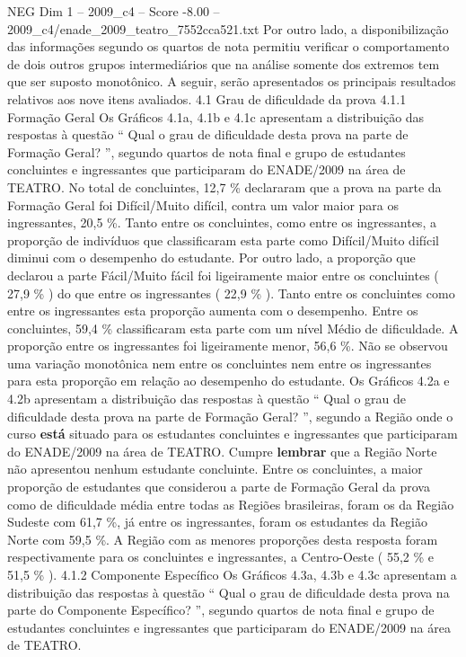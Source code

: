 \begin{textsample}{NEG Dim 1 – 2009\_c4 – Score -8.00 – 2009\_c4/enade\_2009\_teatro\_7552cca521.txt}
Por outro lado, a disponibilização das informações segundo os quartos de nota permitiu verificar o comportamento de dois outros grupos intermediários que na análise somente dos extremos tem que ser suposto monotônico.
A seguir, serão apresentados os principais resultados relativos aos nove itens avaliados. 4.1 Grau de dificuldade da prova 4.1.1 Formação Geral Os Gráficos 4.1a, 4.1b e 4.1c apresentam a distribuição das respostas à questão “ Qual o grau de dificuldade desta prova na parte de Formação Geral? ”, segundo quartos de nota final e grupo de estudantes concluintes e ingressantes que participaram do ENADE/2009 na área de TEATRO.
No total de concluintes, 12,7 \% declararam que a prova na parte da Formação Geral foi Difícil/Muito difícil, contra um valor maior para os ingressantes, 20,5 \%.
Tanto entre os concluintes, como entre os ingressantes, a proporção de indivíduos que classificaram esta parte como Difícil/Muito difícil diminui com o desempenho do estudante.
Por outro lado, a proporção que declarou a parte Fácil/Muito fácil foi ligeiramente maior entre os concluintes ( 27,9 \% ) do que entre os ingressantes ( 22,9 \% ).
Tanto entre os concluintes como entre os ingressantes esta proporção aumenta com o desempenho.
Entre os concluintes, 59,4 \% classificaram esta parte com um nível Médio de dificuldade.
A proporção entre os ingressantes foi ligeiramente menor, 56,6 \%.
Não se observou uma variação monotônica nem entre os concluintes nem entre os ingressantes para esta proporção em relação ao desempenho do estudante.
Os Gráficos 4.2a e 4.2b apresentam a distribuição das respostas à questão “ Qual o grau de dificuldade desta prova na parte de Formação Geral? ”, segundo a Região onde o curso \textbf{está} situado para os estudantes concluintes e ingressantes que participaram do ENADE/2009 na área de TEATRO.
Cumpre \textbf{lembrar} que a Região Norte não apresentou nenhum estudante concluinte.
Entre os concluintes, a maior proporção de estudantes que considerou a parte de Formação Geral da prova como de dificuldade média entre todas as Regiões brasileiras, foram os da Região Sudeste com 61,7 \%, já entre os ingressantes, foram os estudantes da Região Norte com 59,5 \%.
A Região com as menores proporções desta resposta foram respectivamente para os concluintes e ingressantes, a Centro-Oeste ( 55,2 \% e 51,5 \% ). 4.1.2 Componente Específico Os Gráficos 4.3a, 4.3b e 4.3c apresentam a distribuição das respostas à questão “ Qual o grau de dificuldade desta prova na parte do Componente Específico? ”, segundo quartos de nota final e grupo de estudantes concluintes e ingressantes que participaram do ENADE/2009 na área de TEATRO.

\end{textsample}
